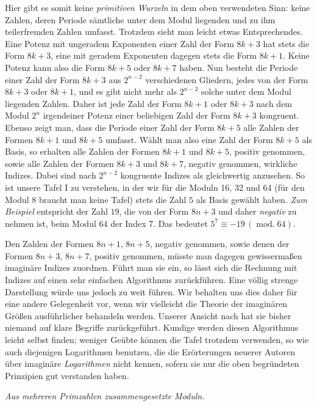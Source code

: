 Hier gibt es somit keine \emph{primitiven Wurzeln} in dem oben verwendeten Sinn: keine Zahlen, deren Periode sämtliche unter dem Modul liegenden und zu ihm teilerfremden Zahlen umfasst. Trotzdem sieht man leicht etwas Entsprechendes. Eine Potenz mit ungeradem Exponenten einer Zahl der Form $8k+3$ hat stets die Form $8k+3$, eine mit geradem Exponenten dagegen stets die Form $8k+1$. Keine Potenz kann also die Form $8k+5$ oder $8k+7$ haben. Nun besteht die Periode einer Zahl der Form $8k+3$ aus $2^{n-2}$ verschiedenen Gliedern, jedes von der Form $8k+3$ oder $8k+1$, und es gibt nicht mehr als $2^{n-2}$ solche unter dem Modul liegenden Zahlen. Daher ist jede Zahl der Form $8k+1$ oder $8k+3$ nach dem Modul $2^n$ irgendeiner Potenz einer beliebigen Zahl der Form $8k+3$ kongruent. Ebenso zeigt man, dass die Periode einer Zahl der Form $8k+5$ alle Zahlen der Formen $8k+1$ und $8k+5$ umfasst. Wählt man also eine Zahl der Form $8k+5$ als Basis, so erhalten alle Zahlen der Formen $8k+1$ und $8k+5$, positiv genommen, sowie alle Zahlen der Formen $8k+3$ und $8k+7$, negativ genommen, wirkliche Indizes. Dabei sind nach $2^{n-2}$ kongruente Indizes als gleichwertig anzusehen. So ist unsere Tafel I zu verstehen, in der wir für die Moduln 16, 32 und 64
(für den Modul $8$ braucht man keine Tafel) stets die Zahl $5$ als Basis gewählt haben. \emph{Zum Beispiel} entspricht der Zahl $19$, die von der Form $8n+3$ und daher \emph{negativ} zu nehmen ist, beim Modul $64$ der Index $7$. Das bedeutet $5^7\equiv-19\,(\operatorname{mod.}64)$.

Den Zahlen der Formen $8n+1$, $8n+5$, negativ genommen, sowie denen der Formen $8n+3$, $8n+7$, positiv genommen, müsste man dagegen gewissermaßen imaginäre Indizes zuordnen. Führt man sie ein, so lässt sich die Rechnung mit Indizes auf einen sehr einfachen Algorithmus zurückführen. Eine völlig strenge Darstellung würde uns jedoch zu weit führen. Wir behalten uns dies daher für eine andere Gelegenheit vor, wenn wir vielleicht die Theorie der imaginären Größen ausführlicher behandeln werden. Unserer Ansicht nach hat sie bisher niemand auf klare Begriffe zurückgeführt. Kundige werden diesen Algorithmus leicht selbst finden; weniger Geübte können die Tafel trotzdem verwenden, so wie auch diejenigen Logarithmen benutzen, die die Erörterungen neuerer Autoren über imaginäre \emph{Logarithmen} nicht kennen, sofern sie nur die oben begründeten Prinzipien gut verstanden haben.

\begin{center}\small\emph{Aus mehreren Primzahlen zusammengesetzte Moduln.}\end{center}

